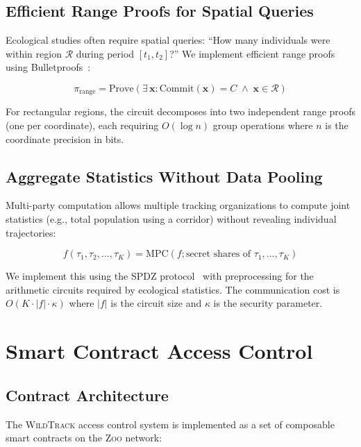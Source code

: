 \documentclass[11pt,letterpaper]{article}
\newcommand{\Zoo}{\textsc{Zoo}}
\newcommand{\WildTrack}{\textsc{WildTrack}}
\begin{document}
\subsection{Efficient Range Proofs for Spatial Queries}

Ecological studies often require spatial queries: ``How many individuals were within region $\mathcal{R}$ during period $[t_1, t_2]$?'' We implement efficient range proofs using Bulletproofs~\cite{bunz2018}:

\begin{equation}
\pi_{\text{range}} = \text{Prove}\left(\exists\, \mathbf{x} : \text{Commit}(\mathbf{x}) = C \;\wedge\; \mathbf{x} \in \mathcal{R}\right)
\end{equation}

For rectangular regions, the circuit decomposes into two independent range proofs (one per coordinate), each requiring $O(\log n)$ group operations where $n$ is the coordinate precision in bits.

\subsection{Aggregate Statistics Without Data Pooling}

Multi-party computation allows multiple tracking organizations to compute joint statistics (e.g., total population using a corridor) without revealing individual trajectories:

\begin{equation}
f(\tau_1, \tau_2, \ldots, \tau_K) = \text{MPC}(f; \text{secret shares of } \tau_1, \ldots, \tau_K)
\end{equation}

We implement this using the SPDZ protocol~\cite{damgard2012} with preprocessing for the arithmetic circuits required by ecological statistics. The communication cost is $O(K \cdot |f| \cdot \kappa)$ where $|f|$ is the circuit size and $\kappa$ is the security parameter.

\section{Smart Contract Access Control}

\subsection{Contract Architecture}

The \WildTrack{} access control system is implemented as a set of composable smart contracts on the \Zoo{} network:
\end{document}

